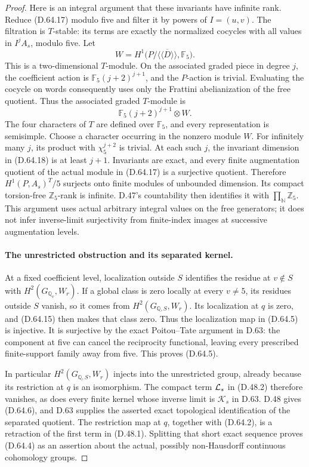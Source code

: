 \begin{proof}
Here is an integral argument that these invariants
have infinite rank. Reduce (D.64.17) modulo five and
filter it by powers of \(I=(u,v)\). The filtration is
\(T\)-stable: its terms are exactly the normalized
cocycles with all values in \(I^jA_s\), modulo five.
Let
\[
 W=H^1\bigl(P/\overline{\langle\!\langle D\rangle\!\rangle},
                                      \mathbb F_5\bigr).
\]
This is a two-dimensional \(T\)-module. On the associated
graded piece in degree \(j\), the coefficient action is
\(\mathbb F_5(j+2)^{j+1}\), and the \(P\)-action is
trivial. Evaluating the cocycle on words consequently
uses only the Frattini abelianization of the free
quotient. Thus the associated graded \(T\)-module is
\[
                 \mathbb F_5(j+2)^{j+1}\otimes W.
                                                        \tag{D.64.18}
\]
The four characters of \(T\) are defined over
\(\mathbb F_5\), and every representation is semisimple.
Choose a character occurring in the nonzero module
\(W\). For infinitely many \(j\), its product with
\(\chi_5^{j+2}\) is trivial. At each such \(j\), the
invariant dimension in (D.64.18) is at least \(j+1\).
Invariants are exact, and every finite augmentation
quotient of the actual module in (D.64.17) is a
surjective quotient. Therefore
\(H^1(P,A_s)^T/5\) surjects onto finite modules of
unbounded dimension. Its compact torsion-free
\(\mathbb Z_5\)-rank is infinite. D.47's countability
then identifies it with \(\prod_{\mathbb N}\mathbb Z_5\).
This argument uses actual arbitrary integral values on
the free generators; it does not infer inverse-limit
surjectivity from finite-index images at successive
augmentation levels.

\paragraph{The unrestricted obstruction and its separated kernel.}
At a fixed coefficient level, localization outside
\(S\) identifies the residue at \(v\notin S\) with
\(H^2(G_{\mathbb Q_v},W_r)\). If a global class is zero
locally at every \(v\ne5\), its residues outside \(S\)
vanish, so it comes from \(H^2(G_{\mathbb Q,S},W_r)\).
Its localization at \(q\) is zero, and (D.64.15) then
makes that class zero. Thus the localization map in
(D.64.5) is injective. It is surjective by the exact
Poitou--Tate argument in D.63: the component at five
can cancel the reciprocity functional, leaving every
prescribed finite-support family away from five.
This proves (D.64.5).

In particular \(H^2(G_{\mathbb Q,S},W_r)\) injects
into the unrestricted group, already because its
restriction at \(q\) is an isomorphism. The compact
term \({\cal L}_s\) in (D.48.2) therefore vanishes,
as does every finite kernel whose inverse limit is
\(\mathcal K_s\) in D.63. D.48 gives (D.64.6), and
D.63 supplies the asserted exact topological
identification of the separated quotient. The
restriction map at \(q\), together with (D.64.2),
is a retraction of the first term in (D.48.1).
Splitting that short exact sequence proves (D.64.4)
as an assertion about the actual, possibly
non-Hausdorff continuous cohomology groups.


\end{proof}
